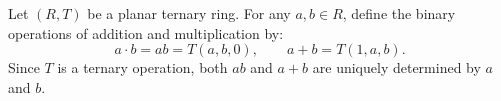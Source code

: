 Let $(R, T)$ be a planar ternary ring. For any $a, b \in R$, define the binary operations of addition and multiplication by:
$$
a \cdot b = ab = T(a, b, 0), \qquad a + b = T(1, a, b).
$$
Since $T$ is a ternary operation, both $ab$ and $a + b$ are uniquely determined by $a$ and $b$.
